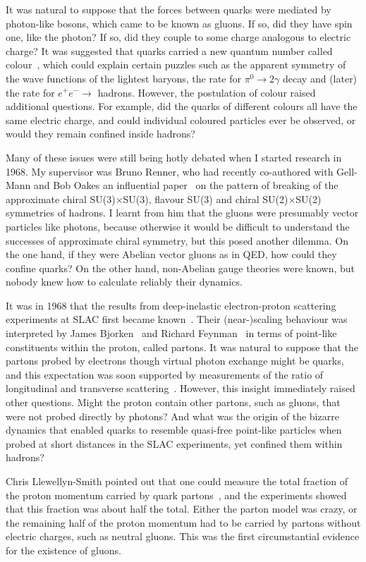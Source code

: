 \documentclass{ws-rv975x65}[12pt]
\begin{document}
It was natural to suppose that the forces between quarks were mediated by photon-like
bosons, which came to be known as gluons. If so, did they have spin one, like the photon?
If so, did they couple to some charge analogous to electric charge? It was suggested that
quarks carried a new quantum number called colour~\cite{colour}, which could explain certain puzzles
such as the apparent symmetry of the wave functions of the lightest baryons, the rate for
$\pi^0 \to 2 \gamma$ decay and (later) the rate for $e^+ e^- \to$ hadrons. However,
the postulation of colour raised additional questions. For example, did the quarks of
different colours all have the same electric charge, and could individual coloured
particles ever be observed, or would they remain confined inside hadrons?

Many of these issues were still being hotly debated when I started research in 1968.
My supervisor was Bruno Renner, who had recently co-authored with Gell-Mann and
Bob Oakes an influential paper~\cite{GOR} on the pattern of breaking of the approximate chiral
SU(3)$\times$SU(3), flavour SU(3) and chiral SU(2)$\times$SU(2) symmetries of hadrons.
I learnt from him that the gluons were presumably vector particles like photons,
because otherwise it would be difficult to understand the successes of approximate
chiral symmetry, but this posed another dilemma. On the one hand, if they were Abelian vector gluons as in QED,
how could they confine quarks? On the other hand, non-Abelian gauge theories were known,
but nobody knew how to calculate reliably their dynamics.

It was in 1968 that the results from deep-inelastic electron-proton scattering experiments at SLAC
first became known~\cite{SLAC}. Their (near-)scaling behaviour was 
interpreted by James Bjorken~\cite{Bj} and Richard Feynman~\cite{RF}
in terms of point-like constituents within the proton, called partons. It was natural to suppose
that the partons probed by electrons though virtual photon exchange
might be quarks, and this expectation was soon supported by
measurements of the ratio of longitudinal and transverse scattering~\cite{CG}.
However, this insight immediately raised other questions. Might the proton contain
other partons, such as gluons, that were not probed directly by photons? And what
was the origin of the bizarre dynamics that enabled quarks to resemble quasi-free
point-like particles when probed at short distances in the SLAC experiments, yet
confined them within hadrons?

Chris Llewellyn-Smith pointed out that one could measure the total fraction of the
proton momentum carried by quark partons~\cite{CHLS}, and the experiments showed
that this fraction was about half the total. Either the parton model was crazy, or
the remaining half of the proton momentum had to be carried by partons without
electric charges, such as neutral gluons. This was the first circumstantial
evidence for the existence of gluons.
\end{document}
